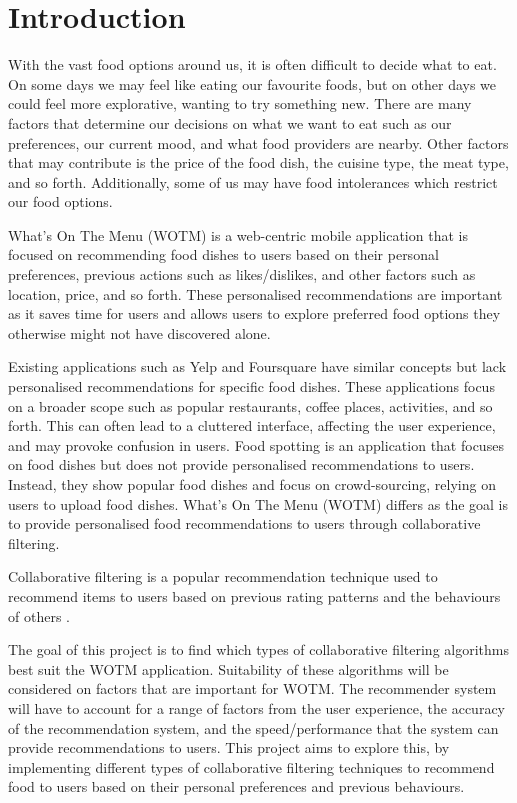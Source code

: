 \chapter{Introduction}\label{C:intro}

With the vast food options around us, it is often difficult to decide what to eat. On some days we may feel like eating our favourite foods, but on other days we could feel more explorative, wanting to try something new. There are many factors that determine our decisions on what we want to eat such as our preferences, our current mood, and what food providers are nearby. Other factors that may contribute is the price of the food dish, the cuisine type, the meat type, and so forth. Additionally, some of us may have food intolerances which restrict our food options.



What’s On The Menu (WOTM) is a web-centric mobile application that is focused on recommending food dishes to users based on their personal preferences, previous actions such as likes/dislikes, and other factors such as location, price, and so forth. These personalised recommendations are important as it saves time for users and allows users to explore preferred food options they otherwise might not have discovered alone. 

Existing applications such as Yelp and Foursquare have similar concepts but lack personalised recommendations for specific food dishes. These applications focus on a broader scope such as popular restaurants, coffee places, activities, and so forth. This can often lead to a cluttered interface, affecting the user experience, and may provoke confusion in users. Food spotting is an application that focuses on food dishes but does not provide personalised recommendations to users. Instead, they show popular food dishes and focus on crowd-sourcing, relying on users to upload food dishes. What's On The Menu (WOTM) differs as the goal is to provide personalised food recommendations to users through collaborative filtering. 

Collaborative filtering is a popular recommendation technique used to recommend items to users based on previous rating patterns and the behaviours of others \cite{itembased, schafer2007collaborative, survey}. 

The goal of this project is to find which types of collaborative filtering algorithms best suit the WOTM application. Suitability of these algorithms will be considered on factors that are important for WOTM. The recommender system will have to account for a range of factors from the user experience, the accuracy of the recommendation system, and the speed/performance that the system can provide recommendations to users. This project aims to explore this, by implementing different types of collaborative filtering techniques to recommend food to users based on their personal preferences and previous behaviours.

